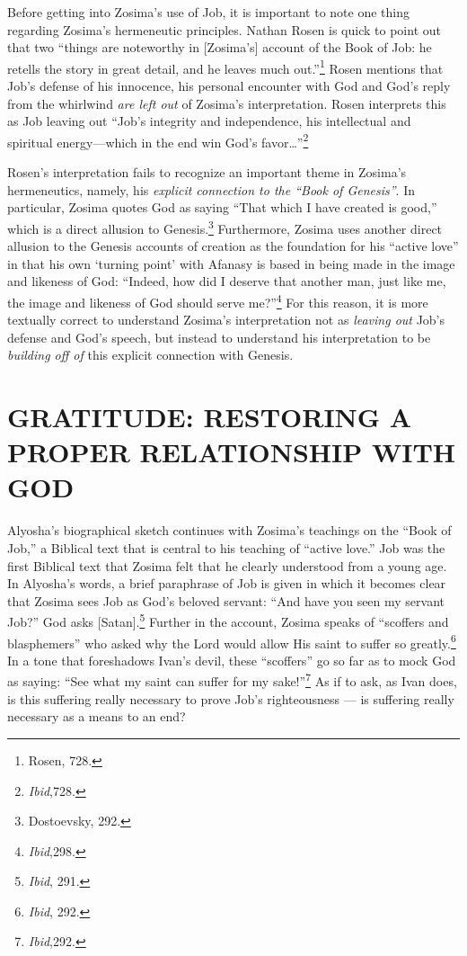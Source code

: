 Before getting into Zosima's use of Job, it is important to note one thing regarding Zosima's hermeneutic principles. Nathan Rosen is quick to point out that two ``things are noteworthy in [Zosima's] account of the Book of Job: he retells the story in great detail, and he leaves much out.''\footnote{Rosen, 728.} Rosen mentions that Job's defense of his innocence, his personal encounter with God and God's reply from the whirlwind \emph{are left out} of Zosima's interpretation. Rosen interprets this as Job leaving out ``Job's integrity and independence, his intellectual and spiritual energy---which in the end win God's favor\ldots''\footnote{\emph{Ibid},728.} 

Rosen's interpretation fails to recognize an important theme in Zosima's hermeneutics, namely, his \emph{explicit connection to the ``Book of Genesis''}. In particular, Zosima quotes God as saying ``That which I have created is good,'' which is a direct allusion to Genesis.\footnote{Dostoevsky, 292.} Furthermore, Zosima uses another direct allusion to the Genesis accounts of creation as the foundation for his ``active love'' in that his own `turning point' with Afanasy is based in being made in the image and likeness of God: ``Indeed, how did I deserve that another man, just like me, the image and likeness of God should serve me?''\footnote{\emph{Ibid},298.} For this reason, it is more textually correct to understand Zosima's interpretation not as \emph{leaving out} Job's defense and God's speech, but instead to understand his interpretation to be \emph{building off of} this explicit connection with Genesis.

\chapter{GRATITUDE: RESTORING A PROPER RELATIONSHIP WITH GOD}
Alyosha's biographical sketch continues with Zosima's teachings on the ``Book of Job,'' a Biblical text that is central to his teaching of ``active love.'' Job was the first Biblical text that Zosima felt that he clearly understood from a young age. In Alyosha's words, a brief paraphrase of Job is given in which it becomes clear that Zosima sees Job as God's beloved servant: ``And have you seen my servant Job?'' God asks [Satan].\footnote{\emph{Ibid}, 291.} Further in the account, Zosima speaks of ``scoffers and blasphemers'' who asked why the Lord would allow His saint to suffer so greatly.\footnote{\emph{Ibid}, 292.} In a tone that foreshadows Ivan's devil, these ``scoffers'' go so far as to mock God as saying: ``See what my saint can suffer for my sake!''\footnote{\emph{Ibid},292.} As if to ask, as Ivan does, is this suffering really necessary to prove Job's righteousness --- is suffering really necessary as a means to an end?

